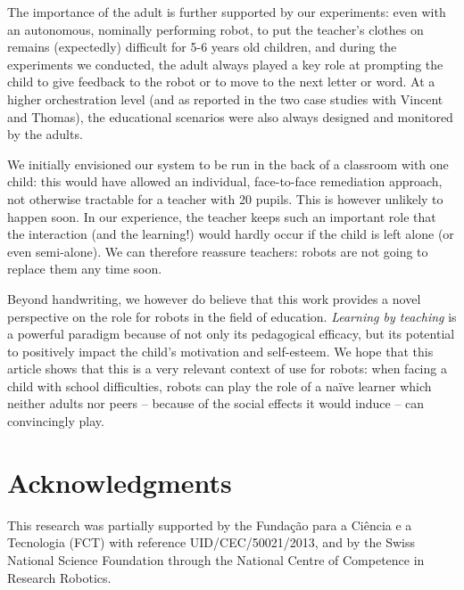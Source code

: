 \documentclass{article}
\begin{document}
The importance of the adult is further supported by our experiments: even with
an autonomous, nominally performing robot, to put the teacher's clothes on
remains (expectedly) difficult for 5-6 years old children, and during the
experiments we conducted, the adult always played a key role at prompting the
child to give feedback to the robot or to move to the next letter or word.  At a
higher orchestration level (and as reported in the two case studies with Vincent
and Thomas), the educational scenarios were also always designed and monitored
by the adults.

We initially envisioned our system to be run in the back of a classroom with one
child: this would have allowed an individual, face-to-face remediation approach,
not otherwise tractable for a teacher with 20 pupils.  This is however unlikely
to happen soon. In our experience, the teacher keeps such an important role that
the interaction (and the learning!) would hardly occur if the child is left
alone (or even semi-alone). We can therefore reassure teachers: robots are not
going to replace them any time soon.

Beyond handwriting, we however do believe that this work provides a novel
perspective on the role for robots in the field of education. \emph{Learning by
teaching} is a powerful paradigm because of not only its pedagogical efficacy,
but its potential to positively impact the child's motivation and self-esteem.
We hope that this article shows that this is a very relevant context of use for
robots: when facing a child with school difficulties, robots can play the role
of a na\"ive learner which neither adults nor peers -- because of the social
effects it would induce -- can convincingly play.


\section*{Acknowledgments}

This research was partially supported by the Funda\c{c}\~{a}o para a Ci\^{e}ncia
e a Tecnologia (FCT) with reference UID/CEC/50021/2013, and by the Swiss
National Science Foundation through the National Centre of Competence in
Research Robotics.



\end{document}
